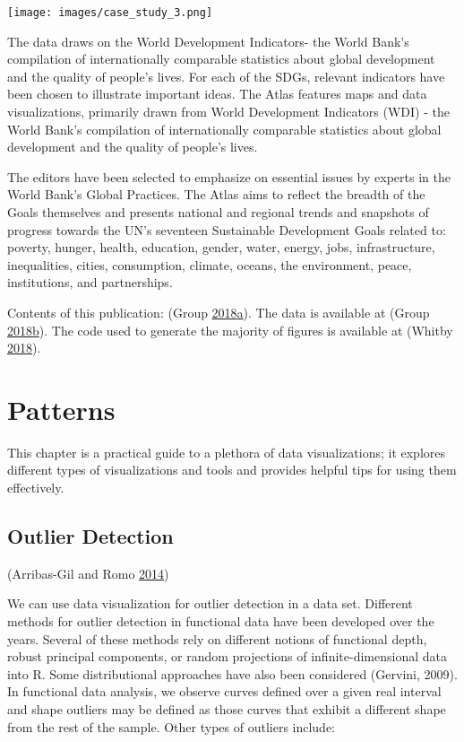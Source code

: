 \documentclass[]{book}
\begin{document}
\texttt{[image: images/case\_study\_3.png]}

The data draws on the World Development Indicators- the World Bank's compilation of internationally comparable statistics about global development and the quality of people's lives. For each of the SDGs, relevant indicators have been chosen to illustrate important ideas.
The Atlas features maps and data visualizations, primarily drawn from World Development Indicators (WDI) - the World Bank's compilation of internationally comparable statistics about global development and the quality of people's lives.

The editors have been selected to emphasize on essential issues by experts in the World Bank's Global Practices. The Atlas aims to reflect the breadth of the Goals themselves and presents national and regional trends and snapshots of progress towards the UN's seventeen Sustainable Development Goals related to: poverty, hunger, health, education, gender, water, energy, jobs, infrastructure, inequalities, cities, consumption, climate, oceans, the environment, peace, institutions, and partnerships.

Contents of this publication: (Group \protect\hyperlink{ref-worldbankpub}{2018}\protect\hyperlink{ref-worldbankpub}{a}).
The data is available at (Group \protect\hyperlink{ref-data_access}{2018}\protect\hyperlink{ref-data_access}{b}).
The code used to generate the majority of figures is available at (Whitby \protect\hyperlink{ref-worldbankcode}{2018}).

\hypertarget{patterns}{%
\chapter{Patterns}\label{patterns}}

This chapter is a practical guide to a plethora of data visualizations; it explores different types of visualizations and tools and provides helpful tips for using them effectively.

\hypertarget{outlier-detection}{%
\section{Outlier Detection}\label{outlier-detection}}

(Arribas-Gil and Romo \protect\hyperlink{ref-outliar}{2014})

We can use data visualization for outlier detection in a data set. Different methods for outlier detection in functional data have been developed over the years. Several of these methods rely on different notions of functional depth, robust principal components, or random projections of infinite-dimensional data into R. Some distributional approaches have also been considered (Gervini, 2009). In functional data analysis, we observe curves defined over a given real interval and shape outliers may be defined as those curves that exhibit a different shape from the rest of the sample. Other types of outliers include:
\end{document}

